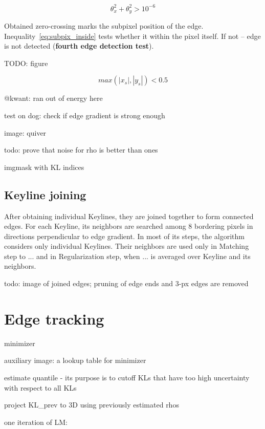 \begin{equation}
\theta_{x}^2 + \theta_{y}^2 > 10^{-6}
\label{eq:test3}
\end{equation}

Obtained zero-crossing marks the subpixel position of the edge. Inequality~\ref{eq:subpix_inside} tests whether it within the pixel itself. If not -- edge is not detected (\textbf{fourth edge detection test}).

TODO: figure

\begin{equation}
max(|x_s|, |y_s|) < 0.5
\label{eq:subpix_inside}
\end{equation}

@kwant: ran out of energy here

test on dog: check if edge gradient is strong enough

image: quiver

todo: prove that noise for rho is better than ones

imgmask with KL indices

\subsection{Keyline joining}

After obtaining individual Keylines, they are joined together to form connected edges.
For each Keyline, its neighbors are searched among 8 bordering pixels in directions perpendicular to edge gradient.
In most of its steps, the algorithm considers only individual Keylines. Their neighbors are used only in Matching step to ... %
and in Regularization step, when ... %
is averaged over Keyline and its neighbors.

todo: image of joined edges; pruning of edge ends and 3-px edges are removed



\section{Edge tracking}


minimizer

auxiliary image: a lookup table for minimizer

estimate quantile - its purpose is to cutoff KLs that have too high uncertainty with respect to all KLs

project KL\_prev to 3D using previously estimated rhos

one iteration of LM:

